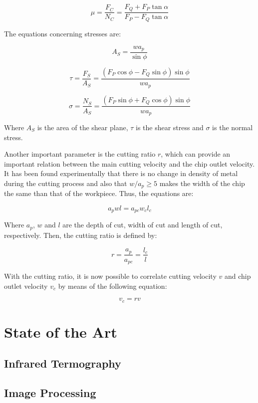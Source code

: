 	\begin{equation} 
	\label{eq_friction}
	\mu = \frac{F_{C}}{N_{C}} = \frac{F_{Q} + F_{P}\tan\alpha}{F_{P} - F_{Q}\tan\alpha}
	\end{equation}

	The equations concerning stresses are:

	\begin{equation} 
	\label{}
	A_{S} = \frac{wa_{p}}{\sin\phi}
	\end{equation}

	\begin{equation} 
	\label{}
	\tau = \frac{F_{S}}{A_{S}} = \frac{(F_{P}\cos\phi - F_{Q}\sin\phi)\sin\phi}{wa_{p}}
	\end{equation}

	\begin{equation} 
	\label{}
	\sigma = \frac{N_{S}}{A_{S}} = \frac{(F_{P}\sin\phi + F_{Q}\cos\phi)\sin\phi}{wa_{p}}
	\end{equation}

	Where $A_{S}$ is the area of the shear plane, $\tau$ is the shear stress and $\sigma$ is the normal stress.

	Another important parameter is the cutting ratio $r$, which can provide an important relation between the main cutting velocity and the chip outlet velocity. It has been found experimentally that there is no change in density of metal during the cutting process and also that $w/a_{p} \geq 5$ makes the width of the chip the same than that of the workpiece. Thus, the equations are:

	\begin{equation} 
	\label{}
	a_{p}wl = a_{pc}w_{c}l_{c}
	\end{equation}

	Where $a_{p}$, $w$ and $l$ are the depth of cut, width of cut and length of cut, respectively. Then, the cutting ratio is defined by:

	\begin{equation} 
	\label{}
	r = \frac{a_{p}}{a_{pc}} = \frac{l_{c}}{l}
	\end{equation}

	With the cutting ratio, it is now possible to correlate cutting velocity $v$ and chip outlet velocity $v_{c}$ by means of the following equation:

	\begin{equation} 
	\label{}
	v_{c} = rv
	\end{equation}

\section{State of the Art}

\subsection{Infrared Termography}
	\label{sec:infrared}

\subsection{Image Processing}
	
